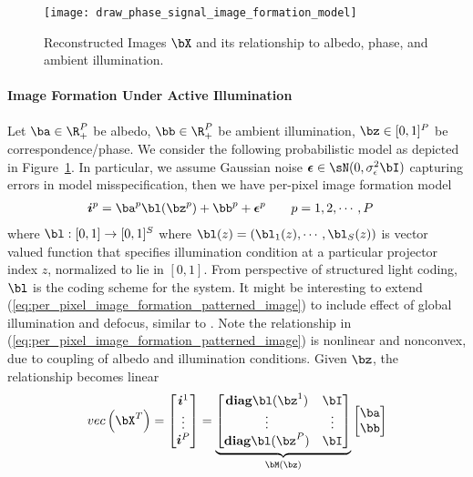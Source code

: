 \documentclass[../writeup.tex]{subfiles}
\begin{document}
\begin{figure}[h!]
    \begin{center}
        \texttt{[image: draw\_phase\_signal\_image\_formation\_model]}
        \caption{Reconstructed Images $\bX$ and its relationship to albedo, phase, and ambient illumination.}
        \label{fig:draw_phase_signal_image_formation_model}
    \end{center}
\end{figure}  

\paragraph{Image Formation Under Active Illumination}

Let $\ba \in \R_+^{P}$ be albedo, $\bb\in\R_+^P$ be ambient illumination, $\bz\in[0,1]^{P}$ be correspondence/phase. We consider the following probabilistic model as depicted in Figure~\ref{fig:draw_phase_signal_image_formation_model}. In particular, we assume Gaussian noise $\bepsilon\in\sN(0,\sigma^2_{\epsilon}\bI)$ capturing errors in model misspecification, then we have per-pixel image formation model
\begin{align}
    \si^p
        &= \ba^p \bl(\bz^p) + \bb^p + \bepsilon^p
        \qquad
        p = 1,2,\cdots,P
    \label{eq:per_pixel_image_formation_patterned_image}
\end{align}
where $\bl:[0,1]\to [0,1]^S$ where $\bl(z) = (\bl_1(z),\cdots,\bl_S(z))$ is vector valued function that specifies illumination condition at a particular projector index $z$, normalized to lie in $[0,1]$. From perspective of structured light coding, $\bl$ is the coding scheme for the system. It might be interesting to extend (\ref{eq:per_pixel_image_formation_patterned_image}) to include effect of global illumination and defocus, similar to \cite{guptaMicroPhaseShifting2012}. Note the relationship in (\ref{eq:per_pixel_image_formation_patterned_image}) is nonlinear and nonconvex, due to coupling of albedo and illumination conditions. Given $\bz$, the relationship becomes linear
\begin{align}
    \vec{\bX^T}
        =
    \begin{bmatrix}
        \si^1 \\
        \vdots \\
        \si^P \\
    \end{bmatrix}
        =
        \underbrace{
            \begin{bmatrix}
                \diag \bl(\bz^1) & \bI \\ 
                \vdots & \vdots \\ 
                \diag \bl(\bz^P) & \bI \\
            \end{bmatrix}
        }_{\bM(\bz)}
        \begin{bmatrix}
            \ba \\ \bb 
        \end{bmatrix}
    \label{eq:per_pixel_image_formation_patterned_image_given_correspondence}
\end{align}
\end{document}
